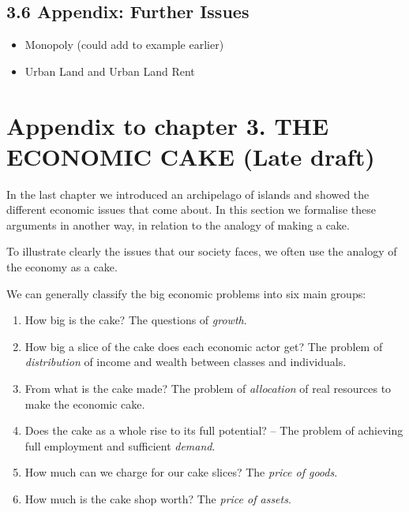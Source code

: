\documentclass[]{tufte-handout}
\providecommand{\tightlist}{%
  \setlength{\itemsep}{0pt}\setlength{\parskip}{0pt}}
\begin{document}
\hypertarget{appendix-further-issues}{%
\subsection{3.6 Appendix: Further
Issues}\label{appendix-further-issues}}

\begin{itemize}
\tightlist
\item
  Monopoly (could add to example earlier)
\item
  Urban Land and Urban Land Rent
\end{itemize}

\hypertarget{appendix-to-chapter-3.-the-economic-cake-late-draft}{%
\section{Appendix to chapter 3. THE ECONOMIC CAKE (Late
draft)}\label{appendix-to-chapter-3.-the-economic-cake-late-draft}}

In the last chapter we introduced an archipelago of islands and showed
the different economic issues that come about. In this section we
formalise these arguments in another way, in relation to the analogy of
making a cake.

To illustrate clearly the issues that our society faces, we often use
the analogy of the economy as a cake.

We can generally classify the big economic problems into six main
groups:

\begin{enumerate}
\def\labelenumi{\arabic{enumi}.}
\tightlist
\item
  How big is the cake? The questions of \emph{growth}.
\item
  How big a slice of the cake does each economic actor get? The problem
  of \emph{distribution} of income and wealth between classes and
  individuals.
\item
  From what is the cake made? The problem of \emph{allocation} of real
  resources to make the economic cake.
\item
  Does the cake as a whole rise to its full potential? -- The problem of
  achieving full employment and sufficient \emph{demand}.
\item
  How much can we charge for our cake slices? The \emph{price of goods}.
\item
  How much is the cake shop worth? The \emph{price of assets}.
\end{enumerate}
\end{document}
